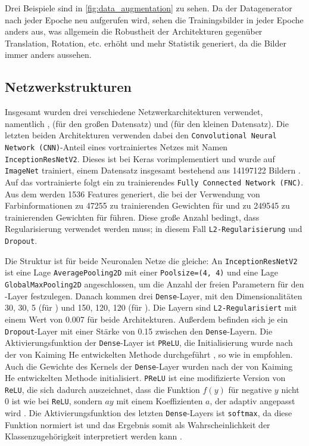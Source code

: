 Drei Beispiele sind in \autoref{fig:data_augmentation} zu sehen.
Da der Datagenerator nach jeder Epoche neu aufgerufen wird, sehen die
Trainingsbilder in jeder Epoche anders aus, was allgemein die Robustheit der
Architekturen gegenüber Translation, Rotation, etc. erhöht und mehr
Statistik generiert, da die Bilder immer anders aussehen.

\subsection{Netzwerkstrukturen}
\label{sec:netzwerk}
Insgesamt wurden drei verschiedene Netzwerkarchitekturen verwendet, namentlich
\MiniDog{}, \PreDog{} (für den großen Datensatz) und \PreBig{} (für den kleinen
Datensatz). Die letzten beiden Architekturen verwenden dabei den
\texttt{Convolutional Neural Network (CNN)}-Anteil eines vortrainiertes Netzes
mit Namen \texttt{InceptionResNetV2}. Dieses ist bei Keras vorimplementiert
\cite{inception} und wurde auf \texttt{ImageNet} trainiert, einem Datensatz
insgesamt bestehend aus 14197122 Bildern \cite{imagenet}. Auf das vortrainierte
\CNN{} folgt ein zu trainierendes \texttt{Fully Connected Network (FNC)}.
Aus dem \CNN{} werden 1536 Features generiert, die bei der Verwendung von Farbinformationen
zu 47255 zu trainierenden Gewichten für \PreDog{} und zu 249545 zu trainierenden Gewichten
für \PreBig{} führen. Diese große Anzahl bedingt, dass Regularisierung verwendet werden
muss; in diesem Fall \texttt{L2-Regularisierung} und \texttt{Dropout}.

Die Struktur ist für beide Neuronalen Netze die gleiche: An
\texttt{InceptionResNetV2} ist eine Lage \texttt{AveragePooling2D} mit einer
\texttt{Poolsize=(4, 4)} und eine Lage \texttt{GlobalMaxPooling\-2D}
angeschlossen, um die Anzahl der freien Parametern für den \FNC{}-Layer
festzulegen. Danach kommen drei \texttt{Dense}-Layer, mit den Dimensionalitäten
30, 30, 5 (für \PreDog{}) und 150, 120, 120 (für \PreBig{}). Die Layern sind
\texttt{L2-Regularisiert} mit einem Wert von 0.007 für beide Architekturen.
Außerdem befinden sich je ein \texttt{Dropout}-Layer mit einer Stärke von 0.15
zwischen den \texttt{Dense}-Layern. Die Aktivierungsfunktion der
\texttt{Dense}-Layer ist \texttt{PReLU}, die Initialisierung wurde nach der von
Kaiming He entwickelten Methode durchgeführt \cite{tensowflow-he}, so wie in
\cite{he-ini} empfohlen. Auch die Gewichte des Kernels der \texttt{Dense}-Layer
wurden nach der von Kaiming He entwickelten Methode initialisiert.
\texttt{PReLU} ist eine modifizierte Version von \texttt{ReLU}, die sich dadurch
auszeichnet, dass die Funktion $f(y)$ für negative $y$ nicht 0 ist wie bei
\texttt{ReLU}, sondern $ay$ mit einem Koeffizienten $a$, der adaptiv angepasst
wird \cite{prelu}. Die Aktivierungsfunktion des letzten \texttt{Dense}-Layers
ist \texttt{softmax}, da diese Funktion normiert ist und das Ergebnis somit als
Wahrscheinlichkeit der Klassenzugehörigkeit interpretiert werden kann
\cite[S. 139]{hands_on_machine_learning}.

